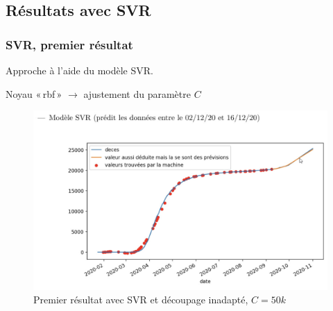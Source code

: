 \documentclass{beamer}
\begin{document}
\subsection{Résultats avec SVR}
\begin{frame}
	\frametitle{SVR, premier résultat}
	Approche à l'aide du modèle SVR.
	
	Noyau «\,rbf\,» $\rightarrow$ ajustement du paramètre $C$
	\begin{figure}[tc]
		\includegraphics[scale=0.2]{SVR_premierdecoup}
		\centering
		\caption{Premier résultat avec SVR et découpage inadapté, $C=50k$}
	\end{figure}
\end{frame}
\end{document}
